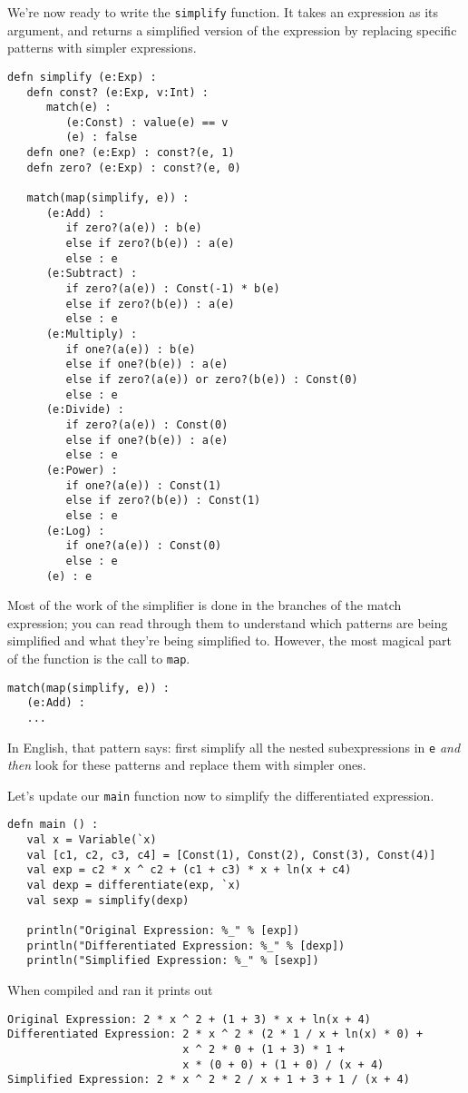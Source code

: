 \documentclass[10pt,oneside]{book}
\begin{document}
We're now ready to write the \texttt{\frenchspacing simplify} function. It takes an expression as its argument, and returns a simplified version of the expression by replacing specific patterns with simpler expressions. 
\begin{lstlisting}
defn simplify (e:Exp) :
   defn const? (e:Exp, v:Int) :
      match(e) :
         (e:Const) : value(e) == v
         (e) : false
   defn one? (e:Exp) : const?(e, 1)
   defn zero? (e:Exp) : const?(e, 0)   

   match(map(simplify, e)) :
      (e:Add) :
         if zero?(a(e)) : b(e)
         else if zero?(b(e)) : a(e)
         else : e
      (e:Subtract) :
         if zero?(a(e)) : Const(-1) * b(e)
         else if zero?(b(e)) : a(e)
         else : e         
      (e:Multiply) :
         if one?(a(e)) : b(e)
         else if one?(b(e)) : a(e)
         else if zero?(a(e)) or zero?(b(e)) : Const(0)
         else : e
      (e:Divide) :
         if zero?(a(e)) : Const(0)
         else if one?(b(e)) : a(e)
         else : e
      (e:Power) :
         if one?(a(e)) : Const(1)
         else if zero?(b(e)) : Const(1)
         else : e
      (e:Log) :
         if one?(a(e)) : Const(0)
         else : e
      (e) : e
\end{lstlisting}
Most of the work of the simplifier is done in the branches of the match expression; you can read through them to understand which patterns are being simplified and what they're being simplified to. However, the most magical part of the function is the call to \texttt{\frenchspacing map}. 
\begin{lstlisting}
match(map(simplify, e)) :
   (e:Add) :
   ...
\end{lstlisting}
In English, that pattern says: first simplify all the nested subexpressions in \texttt{\frenchspacing e} {\em and then} look for these patterns and replace them with simpler ones. 

Let's update our \texttt{\frenchspacing main} function now to simplify the differentiated expression.
\begin{lstlisting}
defn main () :
   val x = Variable(`x)
   val [c1, c2, c3, c4] = [Const(1), Const(2), Const(3), Const(4)]
   val exp = c2 * x ^ c2 + (c1 + c3) * x + ln(x + c4)
   val dexp = differentiate(exp, `x)
   val sexp = simplify(dexp)

   println("Original Expression: %_" % [exp])
   println("Differentiated Expression: %_" % [dexp])
   println("Simplified Expression: %_" % [sexp])   
\end{lstlisting}
When compiled and ran it prints out
\begin{lstlisting}
Original Expression: 2 * x ^ 2 + (1 + 3) * x + ln(x + 4)
Differentiated Expression: 2 * x ^ 2 * (2 * 1 / x + ln(x) * 0) +
                           x ^ 2 * 0 + (1 + 3) * 1 +
                           x * (0 + 0) + (1 + 0) / (x + 4)
Simplified Expression: 2 * x ^ 2 * 2 / x + 1 + 3 + 1 / (x + 4)
\end{lstlisting}
\end{document}
